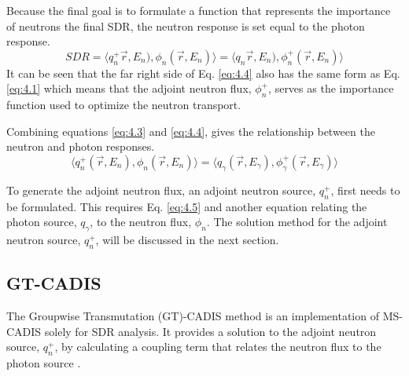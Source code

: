 Because the final goal is to formulate a function that represents the importance
of neutrons the final SDR, the
neutron response is set equal to the photon response.
\begin{equation} \label{eq:4.4}
  SDR =  \langle q_{n}^{+}\overrightarrow{r},E_{n}),
  \phi_{n}(\overrightarrow{r}, E_{n}) \rangle 
  = \langle q_{n}\overrightarrow{r},E_{n}),
  \phi_{n}^{+}(\overrightarrow{r}, E_{n}) \rangle 
\end{equation}
It can be seen that the far right side of Eq. \ref{eq:4.4} also has the same 
form as Eq. \ref{eq:4.1} which means that the adjoint neutron flux, $\phi_n^+$, 
serves as the importance function used to optimize the neutron transport.

Combining equations \ref{eq:4.3} and \ref{eq:4.4}, 
gives the relationship between the neutron and photon responses.
\begin{equation} \label{eq:4.5}
	\langle q_{n}^{+}(\overrightarrow{r},E_{n}),
  \phi_{n}(\overrightarrow{r}, E_{n}) \rangle 
	= \langle q_{\gamma}(\overrightarrow{r},E_{\gamma}),
  \phi_{\gamma}^{+}(\overrightarrow{r}, E_{\gamma}) \rangle 
\end{equation}

To generate the adjoint neutron flux, 
an adjoint neutron source, $q_n^{+}$, first needs to be formulated.
This requires Eq. \ref{eq:4.5} and another equation
relating the photon source, $q_\gamma$, to the neutron flux, $\phi_n$.
The solution method for the adjoint neutron source, $q_n^+$, will be discussed in the 
next section.

\subsection{GT-CADIS}
The Groupwise Transmutation (GT)-CADIS method is an implementation of MS-CADIS
solely for SDR analysis.  It provides a solution to the adjoint neutron source, 
$q_n^+$, by calculating a coupling term that relates the neutron flux to the photon 
source \cite{gtcadis}.


